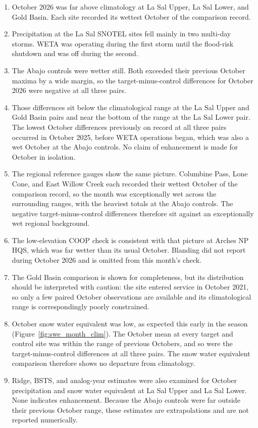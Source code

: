\documentclass[11pt]{article}
\begin{document}
\begin{enumerate}
  \item October 2026 was far above climatology at La Sal Upper, La Sal Lower, and Gold Basin.
        Each site recorded its wettest October of the comparison record.
  \item Precipitation at the La Sal SNOTEL sites fell mainly in two multi-day storms. WETA was
        operating during the first storm until the flood-risk shutdown and was off during the
        second.
  \item The Abajo controls were wetter still. Both exceeded their previous October maxima by
        a wide margin, so the target-minus-control differences for October 2026 were negative
        at all three pairs.
  \item Those differences sit below the climatological range at the La Sal Upper and Gold Basin
        pairs and near the bottom of the range at the La Sal Lower pair. The lowest October
        differences previously on record at all three pairs occurred in October 2025, before
        WETA operations began, which was also a wet October at the Abajo controls. No claim of
        enhancement is made for October in isolation.
  \item The regional reference gauges show the same picture. Columbine Pass, Lone Cone, and
        East Willow Creek each recorded their wettest October of the comparison record, so the
        month was exceptionally wet across the surrounding ranges, with the heaviest totals at
        the Abajo controls. The negative target-minus-control differences therefore sit
        against an exceptionally wet regional background.
  \item The low-elevation COOP check is consistent with that picture at Arches NP HQS, which was
        far wetter than its usual October. Blanding did not report during October 2026 and is
        omitted from this month's check.
  \item The Gold Basin comparison is shown for completeness, but its distribution should be
        interpreted with caution: the site entered service in October 2021, so only a few paired
        October observations are available and its climatological range is correspondingly
        poorly constrained.
  \item October snow water equivalent was low, as expected this early in the season
        (Figure~\ref{fig:swe_month_clim}). The October mean at every target and control site
        was within the range of previous Octobers, and so were the target-minus-control
        differences at all three pairs. The snow water equivalent comparison therefore shows
        no departure from climatology.
  \item Ridge, BSTS, and analog-year estimates were also examined for October precipitation
        and snow water equivalent at La Sal Upper and La Sal Lower. None indicates
        enhancement. Because the Abajo controls were far outside their previous October
        range, these estimates are extrapolations and are not reported numerically.
\end{enumerate}
 
\end{document}
